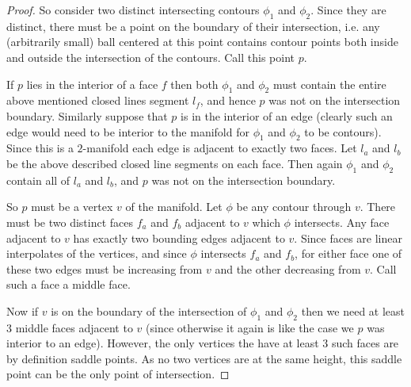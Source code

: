 \documentclass[11pt]{article}
\theoremstyle{definition}
\newcommand{\MM}{\mathbb{M}}
\begin{document}
{\begin{proof}
So consider two distinct intersecting contours $\phi_1$ and $\phi_2$.  Since they are distinct, there must be a point on the boundary of their intersection, i.e. any (arbitrarily small) ball centered at this point contains contour points both inside and outside the intersection of the contours.  Call this point $p$.

If $p$ lies in the interior of a face $f$ then both $\phi_1$ and $\phi_2$ must contain the entire above mentioned closed lines segment $l_f$, and hence $p$ was not on the intersection boundary. 
Similarly suppose that $p$ is in the interior of an edge (clearly such an edge would need to be interior to the manifold for $\phi_1$ and $\phi_2$ to be contours).  Since this is a $2$-manifold each edge is adjacent to exactly two faces.  Let $l_a$ and $l_b$ be the above described closed line segments on each face.  Then again $\phi_1$ and $\phi_2$ contain all of $l_a$ and $l_b$, and $p$ was not on the intersection boundary.

So $p$ must be a vertex $v$ of the manifold.  Let $\phi$ be any contour through $v$.  There must be two distinct faces $f_a$ and $f_b$ adjacent to $v$ which $\phi$ intersects.  Any face adjacent to $v$ has exactly two bounding edges adjacent to $v$.  Since faces are linear interpolates of the vertices, and since $\phi$ intersects $f_a$ and $f_b$, for either face one of these two edges must be increasing from $v$ and the other decreasing from $v$.  Call such a face a middle face.

Now if $v$ is on the boundary of the intersection of $\phi_1$ and $\phi_2$ then we need at least 3 middle faces adjacent to $v$ (since otherwise it again is like the case we $p$ was interior to an edge).  However, the only vertices the have at least 3 such faces are by definition saddle points.  As no two vertices are at the same height, this saddle point can be the only point of intersection.
\end{proof}


}
\end{document}
